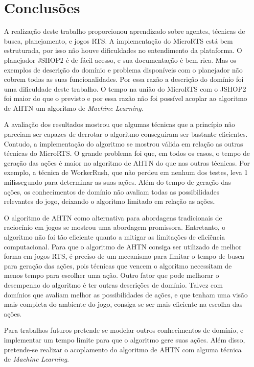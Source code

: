 
\chapter{\label{chap:concl}Conclusões}

A realização deste trabalho proporcionou aprendizado sobre agentes, técnicas de busca, planejamento, e jogos RTS.
A implementação do MicroRTS está bem estruturada, por isso não houve dificuldades no entendimento da plataforma.
O planejador JSHOP2 é de fácil acesso, e sua documentação é bem rica.
Mas os exemplos de descrição do domínio e problema disponíveis com o planejador não cobrem todas as suas funcionalidades.
Por essa razão a descrição do domínio foi uma dificuldade deste trabalho.
O tempo na união do MicroRTS com o JSHOP2 foi maior do que o previsto e por essa razão não foi possível acoplar ao algoritmo de AHTN um algoritmo de \textit{Machine Learning}.

A avaliação dos resultados mostrou que algumas técnicas que a princípio não pareciam ser capazes de derrotar o algoritmo conseguiram ser bastante eficientes.
Contudo, a implementação do algoritmo se mostrou válida em relação as outras técnicas do MicroRTS.
O grande problema foi que, em todos os casos, o tempo de geração das ações é maior no algoritmo de AHTN do que nas outras técnicas.
Por exemplo, a técnica de WorkerRush, que não perdeu em nenhum dos testes, leva 1 milissegundo para determinar as suas ações.
Além do tempo de geração das ações, os conhecimentos de domínio não avaliam todas as possibilidades relevantes do jogo, deixando o algoritmo limitado em relação as ações.

O algoritmo de AHTN como alternativa para abordagens tradicionais de raciocínio em jogos se mostrou uma abordagem promissora. 
Entretanto, o algoritmo não foi tão eficiente quanto a mitigar as limitações de eficiência computacional.
Para que o algoritmo de AHTN consiga ser utilizado de melhor forma em jogos RTS, é preciso de um mecanismo para limitar o tempo de busca para geração das ações, pois técnicas que vencem o algoritmo necessitam de menos tempo para escolher uma ação.
Outro fator que pode melhorar o desempenho do algoritmo é ter outras descrições de domínio.
Talvez com domínios que avaliam melhor as possibilidades de ações, e que tenham uma visão mais completa do ambiente do jogo, consiga-se ser mais eficiente na escolha das ações. 

Para trabalhos futuros pretende-se modelar outros conhecimentos de domínio, e implementar um tempo limite para que o algoritmo gere suas ações. 
Além disso, pretende-se realizar o acoplamento do algoritmo de AHTN com alguma técnica de \textit{Machine Learning}.
